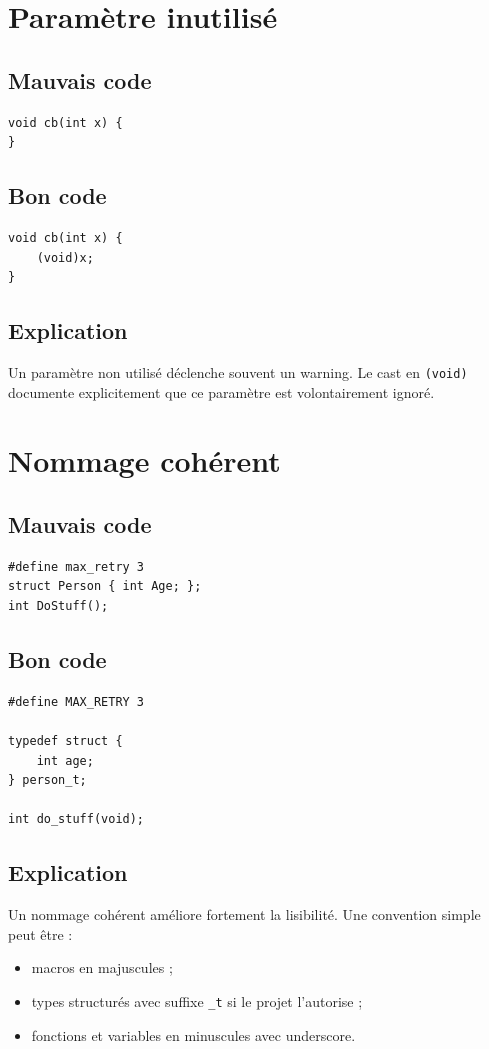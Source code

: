 \documentclass[a4paper,11pt]{report}
\begin{document}
\chapter{Paramètre inutilisé}

\section{Mauvais code}
\begin{lstlisting}
void cb(int x) {
}
\end{lstlisting}

\section{Bon code}
\begin{lstlisting}
void cb(int x) {
    (void)x;
}
\end{lstlisting}

\section{Explication}
Un paramètre non utilisé déclenche souvent un warning.
Le cast en \texttt{(void)} documente explicitement que ce paramètre est volontairement ignoré.

\chapter{Nommage cohérent}

\section{Mauvais code}
\begin{lstlisting}
#define max_retry 3
struct Person { int Age; };
int DoStuff();
\end{lstlisting}

\section{Bon code}
\begin{lstlisting}
#define MAX_RETRY 3

typedef struct {
    int age;
} person_t;

int do_stuff(void);
\end{lstlisting}

\section{Explication}
Un nommage cohérent améliore fortement la lisibilité.
Une convention simple peut être :
\begin{itemize}
    \item macros en majuscules ;
    \item types structurés avec suffixe \texttt{\_t} si le projet l'autorise ;
    \item fonctions et variables en minuscules avec underscore.
\end{itemize}
\end{document}
